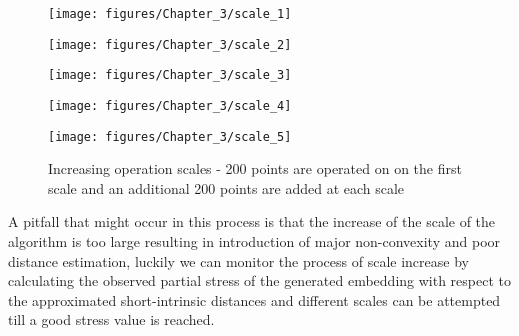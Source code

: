 	\begin{figure}[h]
		\begin{minipage}[t]{0.19\columnwidth}%
			\begin{center}
				\texttt{[image: figures/Chapter\_3/scale\_1]}
				\par\end{center}%
		\end{minipage}\hfill{}%
		\begin{minipage}[t]{0.19\columnwidth}%
			\begin{center}
				\texttt{[image: figures/Chapter\_3/scale\_2]}
				\par\end{center}%
		\end{minipage}\hfill{}%
		\begin{minipage}[t]{0.19\columnwidth}%
			\begin{center}
				\texttt{[image: figures/Chapter\_3/scale\_3]}
				\par\end{center}%
		\end{minipage}\hfill{}%
		\begin{minipage}[t]{0.19\columnwidth}%
			\begin{center}
				\texttt{[image: figures/Chapter\_3/scale\_4]}
				\par\end{center}%
		\end{minipage}\hfill{}%
		\begin{minipage}[t]{0.19\columnwidth}%
			\begin{center}
				\texttt{[image: figures/Chapter\_3/scale\_5]}
				\par\end{center}%
		\end{minipage}
		
		\caption[Increasing operation scales]{Increasing operation scales - 200 points are operated on on the first
			scale and an additional 200 points are added at each scale \label{fig:Increasing-operation-scales}}
	\end{figure}
	
	A pitfall that might occur in this process is that the increase of the scale of the algorithm is too large resulting in introduction of major non-convexity and poor distance estimation, luckily we can monitor the process of scale increase by calculating the observed partial stress of the generated embedding with respect to the approximated short-intrinsic distances and different scales can be attempted till a good stress value is reached.
	
